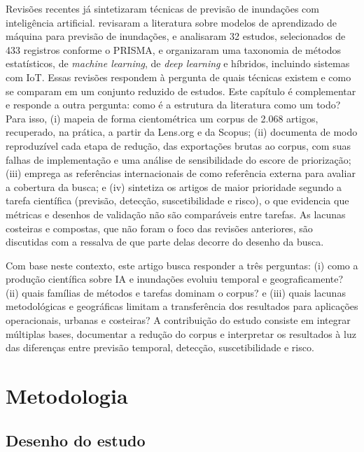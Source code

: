 Revisões recentes já sintetizaram técnicas de previsão de inundações com inteligência artificial.  revisaram a literatura sobre modelos de aprendizado de máquina para previsão de inundações, e  analisaram 32 estudos, selecionados de 433 registros conforme o PRISMA, e organizaram uma taxonomia de métodos estatísticos, de \textit{machine learning}, de \textit{deep learning} e híbridos, incluindo sistemas com IoT. Essas revisões respondem à pergunta de quais técnicas existem e como se comparam em um conjunto reduzido de estudos. Este capítulo é complementar e responde a outra pergunta: como é a estrutura da literatura como um todo? Para isso, (i) mapeia de forma cientométrica um corpus de 2.068 artigos, recuperado, na prática, a partir da Lens.org e da Scopus; (ii) documenta de modo reproduzível cada etapa de redução, das exportações brutas ao corpus, com suas falhas de implementação e uma análise de sensibilidade do escore de priorização; (iii) emprega as referências internacionais de  como referência externa para avaliar a cobertura da busca; e (iv) sintetiza os artigos de maior prioridade segundo a tarefa científica (previsão, detecção, suscetibilidade e risco), o que evidencia que métricas e desenhos de validação não são comparáveis entre tarefas. As lacunas costeiras e compostas, que não foram o foco das revisões anteriores, são discutidas com a ressalva de que parte delas decorre do desenho da busca.

Com base neste contexto, este artigo busca responder a três perguntas: (i) como a produção científica sobre IA e inundações evoluiu temporal e geograficamente? (ii) quais famílias de métodos e tarefas dominam o corpus? e (iii) quais lacunas metodológicas e geográficas limitam a transferência dos resultados para aplicações operacionais, urbanas e costeiras? A contribuição do estudo consiste em integrar múltiplas bases, documentar a redução do corpus e interpretar os resultados à luz das diferenças entre previsão temporal, detecção, suscetibilidade e risco.

\section{Metodologia}
\label{sec:art-metodologia}

\subsection{Desenho do estudo}

